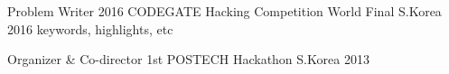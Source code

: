 

\begin{cvhonors}

  \cvhonor
    {Problem Writer} %
    {2016 CODEGATE Hacking Competition World Final} %
    {S.Korea} %
    {2016} %
    {keywords, highlights, etc} %

  \cvhonor
    {Organizer \& Co-director} %
    {1st POSTECH Hackathon} %
    {S.Korea} %
    {2013} %
    {} %

\end{cvhonors}
